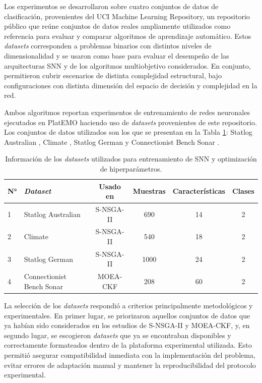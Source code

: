 Los experimentos se desarrollaron sobre cuatro conjuntos de datos de clasificación, provenientes del UCI Machine Learning Repository, un repositorio público que reúne conjuntos de datos reales ampliamente utilizados como referencia para evaluar y comparar algoritmos de aprendizaje automático. Estos \textit{datasets} corresponden a problemas binarios con distintos niveles de dimensionalidad y se usaron como base para evaluar el desempeño de las arquitecturas SNN y de los algoritmos multiobjetivo considerados. En conjunto, permitieron cubrir escenarios de distinta complejidad estructural, bajo configuraciones con distinta dimensión del espacio de decisión y complejidad en la red.

Ambos algoritmos reportan experimentos de entrenamiento de redes neuronales ejecutados en PlatEMO haciendo uso de \textit{datasets} provenientes de este repositorio. Los conjuntos de datos utilizados son los que se presentan en la Tabla \ref{tab:datasets_resumen}: Statlog Australian \cite{quinlan1987statlogAustralian}, Climate \cite{lucas2013climateModelSimulationCrashes}, Statlog German \cite{hofmann1994statlogGermanCredit} y Connectionist Bench Sonar \cite{sejnowski1988connectionistBenchSonar}.

\begin{table}
    \centering
    \small
    \caption{Información de los \textit{datasets} utilizados para entrenamiento de SNN y optimización de hiperparámetros.}
    \label{tab:datasets_resumen}
    \begin{tabular}{lp{5cm}cccc}
    \hline 
      N°&\textit{Dataset}&  Usado en&  Muestras&  Características&  Clases\\ \hline
      1&Statlog Australian&  S-NSGA-II&  690&  14&  2\\
      2&Climate&  S-NSGA-II&  540&  18&  2\\
      3&Statlog German&  S-NSGA-II&  1000&  24&  2\\ 
      4&Connectionist Bench Sonar& MOEA-CKF& 208& 60& 2\\ 
    \hline
\end{tabular}
\end{table}

La selección de los \textit{datasets} respondió a criterios principalmente metodológicos y experimentales. En primer lugar, se priorizaron aquellos conjuntos de datos que ya habían sido considerados en los estudios de S-NSGA-II y MOEA-CKF, y, en segundo lugar, se escogieron \textit{datasets} que ya se encontraban disponibles y correctamente formateados dentro de la plataforma experimental utilizada. Esto permitió asegurar compatibilidad inmediata con la implementación del problema, evitar errores de adaptación manual y mantener la reproducibilidad del protocolo experimental.

